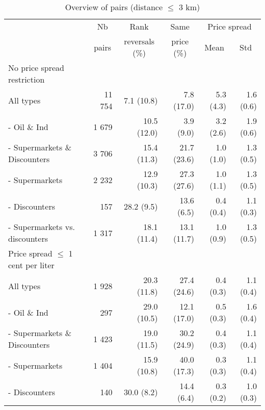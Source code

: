 \documentclass[english]{article}
\begin{document}
\begin{table}
\begin{threeparttable}
\renewcommand{\arraystretch}{0.8} %
\caption{Overview of pairs (distance $\le$ 3 km)}
\label{tab:stats_pair_rank_reversals}
    \begin{tabular}{lrrrrr}
    \toprule
    \toprule
          & \multicolumn{1}{c}{Nb} & \multicolumn{1}{c}{Rank} & \multicolumn{1}{c}{Same} & \multicolumn{2}{c}{Price spread} \\
          & \multicolumn{1}{c}{pairs} & \multicolumn{1}{c}{reversals (\%)} & \multicolumn{1}{c}{price (\%)} & \multicolumn{1}{c}{Mean} & \multicolumn{1}{c}{Std} \\
    \midrule
    No price spread restriction &       &       &       &       &  \\
    All types & 11 754 & 7.1 (10.8) & 7.8 (17.0) & 5.3 (4.3) & 1.6 (0.6) \\
    - Oil \& Ind & 1 679 & 10.5 (12.0) & 3.9 \phantom{0}(9.0) & 3.2 (2.6) & 1.9 (0.6) \\
    - Supermarkets \& Discounters & 3 706 & 15.4 (11.3) & 21.7 (23.6) & 1.0 (1.0) & 1.3 (0.5) \\
    \hspace*{4mm} - Supermarkets & 2 232 & 12.9 (10.3) & 27.3 (27.6) & 1.0 (1.1) & 1.3 (0.5) \\
    \hspace*{4mm} - Discounters & 157   & 28.2 \phantom{0}(9.5) & 13.6 \phantom{0}(6.5) & 0.4 (0.4) & 1.1 (0.3) \\
    \hspace*{4mm} - Supermarkets vs. discounters & 1 317 & 18.1 (11.4) & 13.1 (11.7) & 1.0 (0.9) & 1.3 (0.5) \\
    \midrule
    Price spread $\le$ 1 cent per liter &       &       &       &       &  \\
    All types & 1 928 & 20.3 (11.8) & 27.4 (24.6) & 0.4 (0.3) & 1.1 (0.4) \\
    - Oil \& Ind & 297   & 29.0 (10.5) & 12.1 (17.0) & 0.5 (0.3) & 1.6 (0.4) \\
    - Supermarkets \& Discounters & 1 423 & 19.0 (11.5) & 30.2 (24.9) & 0.4 (0.3) & 1.1 (0.4) \\
    \hspace*{4mm} - Supermarkets & 1 404 & 15.9 (10.8) & 40.0 (17.3) & 0.3 (0.3) & 1.1 (0.4) \\
    \hspace*{4mm} - Discounters & 140   & 30.0 \phantom{0}(8.2) & 14.4 \phantom{0}(6.4) & 0.3 (0.2) & 1.0 (0.3) \\

\end{tabular}
\end{threeparttable}
\end{table}
\end{document}
